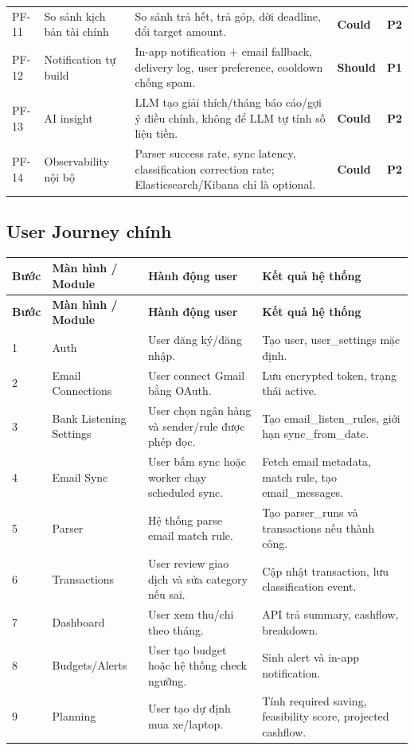 \documentclass[11pt,a4paper]{article}
\renewcommand{\thead}[1]{\textbf{\color{PrimaryDark}#1}}
\newcommand{\badge}[2]{\begingroup\setlength{\fboxsep}{2pt}\colorbox{#1!12}{\textcolor{#1}{\scriptsize\textbf{#2}}}\endgroup}
\newenvironment{tableblock}{\Needspace{8\baselineskip}\vspace{0.25em}}{\vspace{0.75em}}
\begin{document}
\begin{tableblock}
\begin{longtable}{L{1.45cm}L{3.3cm}L{6.95cm}L{1.7cm}L{1.35cm}}
PF-11 & So sánh kịch bản tài chính & So sánh trả hết, trả góp, dời deadline, đổi target amount. & \badge{PriorityP2}{Could} & \badge{PriorityP2}{P2} \\
PF-12 & Notification tự build & In-app notification + email fallback, delivery log, user preference, cooldown chống spam. & \badge{PriorityP1}{Should} & \badge{PriorityP1}{P1} \\
PF-13 & AI insight & LLM tạo giải thích/tháng báo cáo/gợi ý điều chỉnh, không để LLM tự tính số liệu tiền. & \badge{PriorityP2}{Could} & \badge{PriorityP2}{P2} \\
PF-14 & Observability nội bộ & Parser success rate, sync latency, classification correction rate; Elasticsearch/Kibana chỉ là optional. & \badge{PriorityP2}{Could} & \badge{PriorityP2}{P2} \\
\end{longtable}
\end{tableblock}

\subsection{User Journey chính}
\begin{tableblock}
\scriptsize
\begin{longtable}{L{1.3cm}L{3.4cm}L{5.2cm}L{5.4cm}}
\thead{Bước} & \thead{Màn hình / Module} & \thead{Hành động user} & \thead{Kết quả hệ thống} \\
\endfirsthead
{}\thead{Bước} & \thead{Màn hình / Module} & \thead{Hành động user} & \thead{Kết quả hệ thống} \\
 & Auth & User đăng ký/đăng nhập. & Tạo user, user\_settings mặc định. \\
2 & Email Connections & User connect Gmail bằng OAuth. & Lưu encrypted token, trạng thái active. \\
3 & Bank Listening Settings & User chọn ngân hàng và sender/rule được phép đọc. & Tạo email\_listen\_rules, giới hạn sync\_from\_date. \\
4 & Email Sync & User bấm sync hoặc worker chạy scheduled sync. & Fetch email metadata, match rule, tạo email\_messages. \\
5 & Parser & Hệ thống parse email match rule. & Tạo parser\_runs và transactions nếu thành công. \\
6 & Transactions & User review giao dịch và sửa category nếu sai. & Cập nhật transaction, lưu classification event. \\
7 & Dashboard & User xem thu/chi theo tháng. & API trả summary, cashflow, breakdown. \\
8 & Budgets/Alerts & User tạo budget hoặc hệ thống check ngưỡng. & Sinh alert và in-app notification. \\
9 & Planning & User tạo dự định mua xe/laptop. & Tính required saving, feasibility score, projected cashflow. \\
\end{longtable}
\end{tableblock}
\end{document}
